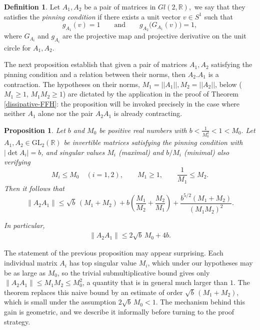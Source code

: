 \documentclass[a4paper,11pt]{article}
\newtheorem{proposition}[lemma]{Proposition}
\theoremstyle{definition}
\newtheorem{definition}[lemma]{Definition}
\def\RR{{\mathbb R}}
\begin{document}


\begin{definition}\label{defi:pinning} Let $A_1, A_2$ be a pair of matrices in $Gl(2,\RR), $ we say that they satisfies the \emph{pinning condition} if there exists a unit vector $v \in S^1$ such that
\[
g_{A_1}(v) = 1 \qquad \text{and} \qquad g_{A_2}\bigl(G_{A_1}(v)\bigr) = 1,
\] where $G_{A_i}$ and $g_{A_i}$ are the projective map and projective derivative on the unit circle for $A_1, A_2.$   
    
\end{definition}



The next proposition establish that given a pair of matrices $A_1, A_2$ satisfying the pinning condition and a relation between their norms, then $A_2.A_1$ is a contraction.  The hypotheses on their norms, $M_1=||A_1||, M_2=||A_2||$, below ($M_1 \geq 1$, 
$M_1 M_2 \geq 1$) are dictated by the application in the proof of Theorem \ref{dissipative-FFH}: the proposition will be invoked precisely in the case where neither $A_1$
 alone nor the pair $A_2A_1$ is already contracting.

\begin{proposition}\label{prop:pinning}
Let $b$ and $M_0$ be positive real numbers with $b < \frac{1}{M_0^2}< 1 < M_0.$
Let $A_1, A_2 \in \mathrm{GL}_2(\mathbb{R})$ be invertible matrices satisfying the pinning condition with $|\det A_i| = b$, and singular values $M_i$ (maximal) and $b/M_i$ (minimal) also verifying
\[
M_i \leq M_0 \quad (i = 1, 2), \qquad M_1 \geq 1, \qquad \frac 1{M_1} \leq  M_2.
\]
 Then it follows that 
\begin{equation}\label{boundA1A2}
\|A_2 A_1\| \leq \sqrt{b}\,(M_1 + M_2) + b\left(\frac{M_1}{M_2} + \frac{M_2}{M_1}\right) +  \frac{b^{5/2}(M_1+M_2)}{(M_1 M_2)^2}.
\end{equation}

In particular,
\begin{eqnarray}\label{boundbM0}
    \|A_2 A_1\| \leq 2\sqrt{b}\,M_0 + 4b.
\end{eqnarray}
\end{proposition}


The statement of the previous proposition may  appear surprising. Each individual matrix $A_i$ has top singular value $M_i$, which under our hypotheses may be as large as $M_0$, so the trivial submultiplicative bound gives only $\|A_2 A_1\| \leq M_1 M_2 \leq M_0^2$, a quantity that is in general much larger than $1$. The theorem replaces this naive bound by an estimate of order $\sqrt b\,(M_1 + M_2)$, which is small under the assumption $2\sqrt b\,M_0 < 1$. The mechanism behind this gain is geometric, and we describe it informally before turning to the proof strategy.
\end{document}
